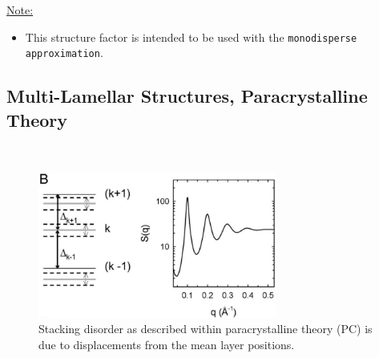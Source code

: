 \noindent\underline{Note:}
\begin{itemize}
\item This structure factor is intended to be used with the \texttt{monodisperse approximation}.
\end{itemize}


\subsection{Multi-Lamellar Structures, Paracrystalline Theory} ~\\

\begin{figure}[htb]
\begin{center}
\includegraphics[width=0.7\textwidth]{ParacrystallineTheorySQ.png}
\end{center}
\caption{Stacking disorder as described within paracrystalline
theory (PC) is due to displacements from the mean layer
positions.} \label{ParacrystallineTheorySQ}
\end{figure}


